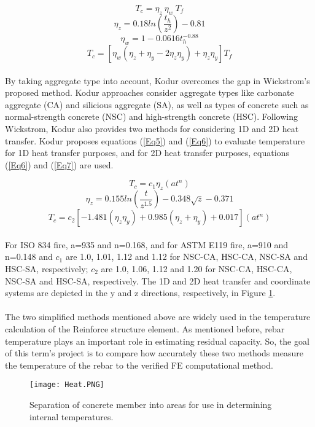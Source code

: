 \documentclass[12pt, letterpaper, oneside]{report}
\begin{document}
\begin{equation}\label{Eq1}
    T_c=\eta_z\ \eta_w\ T_f
\end{equation}
\begin{equation}\label{Eq2}
    \eta_z=0.18ln\left(\frac{t_h}{z^2}\right)-0.81
\end{equation}
\begin{equation}\label{Eq3}
    \eta_w=1-0.0616t_h^{-0.88}
\end{equation}
\begin{equation}\label{Eq4}
    T_c=\left[\eta_w\left(\eta_z+\eta_y-{2\eta}_z\eta_y\right)+\eta_z\eta_y\right]T_f
\end{equation}
\\
By taking aggregate type into account, Kodur \cite{R2} overcomes the gap in Wickstrom's proposed method. Kodur approaches consider aggregate types like carbonate aggregate (CA) and silicious aggregate (SA), as well as types of concrete such as normal-strength concrete (NSC) and high-strength concrete (HSC). Following Wickstrom, Kodur also provides two methods for considering 1D and 2D heat transfer. Kodur proposes equations (\ref{Eq5}) and (\ref{Eq6}) to evaluate temperature for 1D heat transfer purposes, and for 2D heat transfer purposes, equations (\ref{Eq6}) and (\ref{Eq7}) are used.

\begin{equation}\label{Eq5}
    T_c=c_1\eta_z\left(at^n\right)
\end{equation}
\begin{equation}\label{Eq6}
    \eta_z=0.155ln\left(\frac{t}{z^{1.5}}\right)-0.348\sqrt z-0.371
\end{equation}
\begin{equation}\label{Eq7}
    T_c=c_2\left[-1.481\left(\eta_z\eta_y\right)+0.985\left(\eta_z+\eta_y\right)+0.017\right]\left(at^n\right)
\end{equation}
\\
For ISO 834 \cite{R8} fire, a=935 and n=0.168, and for ASTM E119 \cite{R9} fire, a=910 and n=0.148 and \(c_1\) are 1.0, 1.01, 1.12 and 1.12 for NSC-CA, HSC-CA, NSC-SA and HSC-SA, respectively; \(c_2\) are 1.0, 1.06, 1.12 and 1.20 for NSC-CA, HSC-CA, NSC-SA and HSC-SA, respectively. The 1D and 2D heat transfer and coordinate systems are depicted in the y and z directions, respectively, in Figure \ref{fig:1}.
\\
\\
The two simplified methods mentioned above are widely used in the temperature calculation of the Reinforce structure element. As mentioned before, rebar temperature plays an important role in estimating residual capacity. So, the goal of this term's project is to compare how accurately these two methods measure the temperature of the rebar to the verified FE computational method.
\begin{figure}
    \centering
    \texttt{[image: Heat.PNG]}
    \caption{Separation of concrete member into areas for use in determining internal temperatures.}
    \label{fig:1}
\end{figure}
\end{document}
